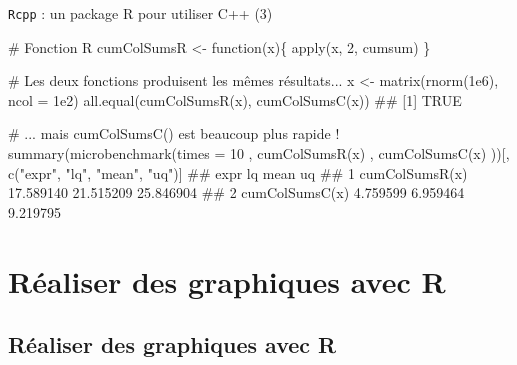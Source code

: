 \documentclass[12pt,handout,ignorenonframetext,]{beamer}
\newenvironment{Shaded}{}{}
\newcommand{\KeywordTok}[1]{\textcolor[rgb]{0.00,0.00,1.00}{#1}}
\newcommand{\DataTypeTok}[1]{#1}
\newcommand{\DecValTok}[1]{#1}
\newcommand{\FloatTok}[1]{#1}
\newcommand{\StringTok}[1]{\textcolor[rgb]{0.00,0.50,0.50}{#1}}
\newcommand{\CommentTok}[1]{\textcolor[rgb]{0.00,0.50,0.00}{#1}}
\newcommand{\ControlFlowTok}[1]{\textcolor[rgb]{0.00,0.00,1.00}{#1}}
\newcommand{\NormalTok}[1]{#1}
\renewenvironment{Shaded}{\begin{snugshade}}{\end{snugshade}}
\begin{document}
\begin{frame}[fragile]{\texttt{Rcpp} : un package R pour utiliser C++
(3)}

\footnotesize

\begin{Shaded}
\begin{Highlighting}[]
\CommentTok{# Fonction R}
\NormalTok{cumColSumsR <-}\StringTok{ }\ControlFlowTok{function}\NormalTok{(x)\{}
  \KeywordTok{apply}\NormalTok{(x, }\DecValTok{2}\NormalTok{, cumsum)}
\NormalTok{\}}

\CommentTok{# Les deux fonctions produisent les mêmes résultats...}
\NormalTok{x <-}\StringTok{ }\KeywordTok{matrix}\NormalTok{(}\KeywordTok{rnorm}\NormalTok{(}\FloatTok{1e6}\NormalTok{), }\DataTypeTok{ncol =} \FloatTok{1e2}\NormalTok{)}
\KeywordTok{all.equal}\NormalTok{(}\KeywordTok{cumColSumsR}\NormalTok{(x), }\KeywordTok{cumColSumsC}\NormalTok{(x))}
\NormalTok{  ## [1] TRUE}

\CommentTok{# ... mais cumColSumsC() est beaucoup plus rapide !}
\KeywordTok{summary}\NormalTok{(}\KeywordTok{microbenchmark}\NormalTok{(}\DataTypeTok{times =} \DecValTok{10}
\NormalTok{  , }\KeywordTok{cumColSumsR}\NormalTok{(x)}
\NormalTok{  , }\KeywordTok{cumColSumsC}\NormalTok{(x)}
\NormalTok{))[, }\KeywordTok{c}\NormalTok{(}\StringTok{"expr"}\NormalTok{, }\StringTok{"lq"}\NormalTok{, }\StringTok{"mean"}\NormalTok{, }\StringTok{"uq"}\NormalTok{)]}
\NormalTok{  ##             expr        lq      mean        uq}
\NormalTok{  ## 1 cumColSumsR(x) 17.589140 21.515209 25.846904}
\NormalTok{  ## 2 cumColSumsC(x)  4.759599  6.959464  9.219795}
\end{Highlighting}
\end{Shaded}

\end{frame}

\section{Réaliser des graphiques avec
R}\label{realiser-des-graphiques-avec-r}

\subsection*{Réaliser des graphiques avec R}
\end{document}
